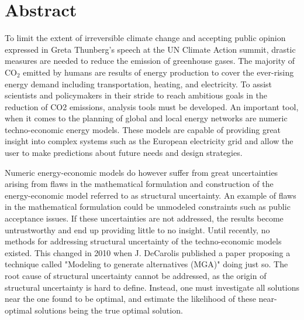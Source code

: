 
\chapter{Abstract}

\begin{adjustwidth}{-10pt}{-20pt}



To limit the extent of irreversible climate change and accepting public opinion expressed in Greta Thunberg's speech at the UN Climate Action summit, drastic measures are needed to reduce the emission of greenhouse gases. The majority of $\text{CO}_2$ emitted by humans are results of energy production to cover the ever-rising energy demand including transportation, heating, and electricity. To assist scientists and policymakers in their stride to reach ambitious goals in the reduction of CO2 emissions, analysis tools must be developed. An important tool, when it comes to the planning of global and local energy networks are numeric techno-economic energy models. These models are capable of providing great insight into complex systems such as the European electricity grid and allow the user to make predictions about future needs and design strategies. 

Numeric energy-economic models do however suffer from great uncertainties arising from flaws in the mathematical formulation and construction of the energy-economic model referred to as structural uncertainty. An example of flaws in the mathematical formulation could be unmodeled constraints such as public acceptance issues.
If these uncertainties are not addressed, the results become untrustworthy and end up providing little to no insight.
Until recently, no methods for addressing structural uncertainty of the techno-economic models existed. This changed in 2010 when J. DeCarolis published a paper proposing a technique called "Modeling to generate alternatives (MGA)" doing just so. The root cause of structural uncertainty cannot be addressed, as the origin of structural uncertainty is hard to define. Instead, one must investigate all solutions near the one found to be optimal, and estimate the likelihood of these near-optimal solutions being the true optimal solution. 


\end{adjustwidth}
